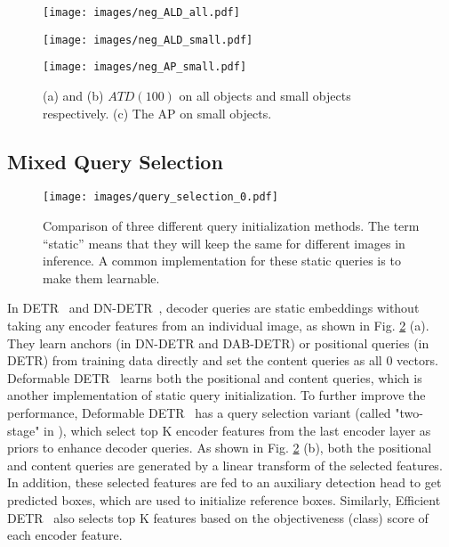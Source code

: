 \documentclass[runningheads]{llncs}
\begin{document}
\begin{figure}[htbp]
\vspace{-0.3cm}
\centering
\begin{minipage}[t]{0.3\textwidth}
\centering
\texttt{[image: images/neg\_ALD\_all.pdf]}
\end{minipage}
\hfill
\begin{minipage}[t]{0.3\textwidth}
\centering
\texttt{[image: images/neg\_ALD\_small.pdf]}
\end{minipage}
\hfill
\begin{minipage}[t]{0.3\textwidth}
\centering
\texttt{[image: images/neg\_AP\_small.pdf]}
\end{minipage}
\vspace{-0.3cm}
\caption{(a) and (b) $ATD(100)$ on all objects and small objects respectively. (c) The AP on small objects.}
\label{fig:neg_dist}
\vspace{-.1cm}
\end{figure} 
\subsection{Mixed Query Selection}
\label{sec:mixed_query_selection}

\begin{figure}[h]
\texttt{[image: images/query\_selection\_0.pdf]}
    \centering
\caption{Comparison of three different query initialization methods. The term ``static'' means that they will keep the same for different images in inference. A common implementation for these static queries is to make them learnable. }
    \label{fig:query_selection}
\end{figure} 
In DETR~\cite{carion2020end} and DN-DETR~\cite{li2022dn}, decoder queries are static embeddings without taking any encoder features from an individual image, as shown in Fig. \ref{fig:query_selection} (a). They learn anchors (in DN-DETR and DAB-DETR) or positional queries (in DETR) from training data directly and set the content queries as all $0$ vectors. 
Deformable DETR~\cite{zhu2020deformable} learns both the positional and content queries, which is another implementation of static query initialization.
To further improve the performance, Deformable DETR~\cite{zhu2020deformable} has a query selection variant (called "two-stage" in \cite{zhu2020deformable}), which select top K encoder features from the last encoder layer as priors to enhance decoder queries. As shown in Fig. \ref{fig:query_selection} (b), both the positional and content queries are generated by a linear transform of the selected features.
In addition, these selected features are fed to an auxiliary detection head to get predicted boxes, which are used to initialize reference boxes. Similarly, Efficient DETR~\cite{yao2021efficient} also selects top K features based on the objectiveness (class) score of each encoder feature. 
\end{document}
